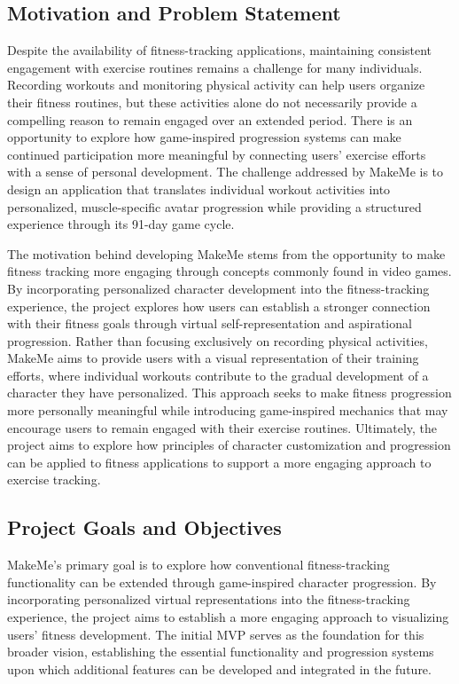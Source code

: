 \documentclass[11pt]{article}
\begin{document}
\subsection{Motivation and Problem Statement}
Despite the availability of fitness-tracking applications, maintaining consistent
engagement with exercise routines remains a challenge for many individuals. Recording
workouts and monitoring physical activity can help users organize their fitness routines,
but these activities alone do not necessarily provide a compelling reason to remain engaged
over an extended period. There is an opportunity to explore how game-inspired progression
systems can make continued participation more meaningful by connecting users' exercise
efforts with a sense of personal development. The challenge addressed by MakeMe is to design
an application that translates individual workout activities into personalized,
muscle-specific avatar progression while providing a structured experience through its
91-day game cycle.

The motivation behind developing MakeMe stems from the opportunity to make fitness
tracking more engaging through concepts commonly found in video games.
By incorporating personalized character development into the fitness-tracking
experience, the project explores how users can establish a stronger connection
with their fitness goals through virtual self-representation and aspirational
progression. Rather than focusing exclusively on recording physical activities,
MakeMe aims to provide users with a visual representation of their training efforts,
where individual workouts contribute to the gradual development of a character
they have personalized. This approach seeks to make fitness progression more
personally meaningful while introducing game-inspired mechanics that may
encourage users to remain engaged with their exercise routines. Ultimately,
the project aims to explore how principles of character customization and progression
can be applied to fitness applications to support a more engaging approach to exercise tracking.
\subsection{Project Goals and Objectives}
MakeMe's primary goal is to explore how conventional fitness-tracking functionality
can be extended through game-inspired character progression. By incorporating personalized
virtual representations into the fitness-tracking experience, the project aims to establish
a more engaging approach to visualizing users' fitness development. The initial MVP serves
as the foundation for this broader vision, establishing the essential functionality and
progression systems upon which additional features can be developed and integrated in the future.
\end{document}

